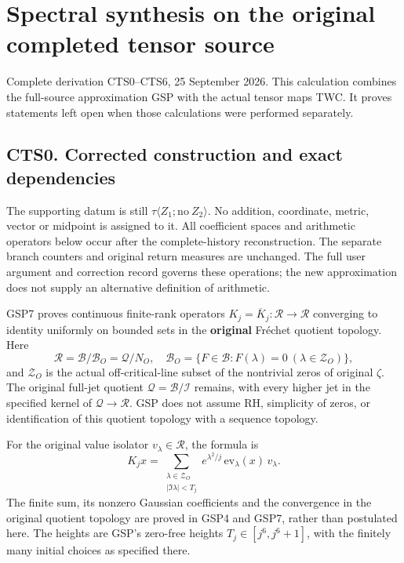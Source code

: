 \section{Spectral synthesis on the original completed tensor
source}\label{spectral-synthesis-on-the-original-completed-tensor-source}

Complete derivation CTS0--CTS6, 25 September 2026. This calculation
combines the full-source approximation GSP with the actual tensor maps
TWC. It proves statements left open when those calculations were
performed separately.

\subsection{CTS0. Corrected construction and exact
dependencies}\label{cts0.-corrected-construction-and-exact-dependencies}

The supporting datum is still
\(\tau\langle Z_1;\mathrm{no}\ Z_2\rangle\). No addition, coordinate,
metric, vector or midpoint is assigned to it. All coefficient spaces and
arithmetic operators below occur after the complete-history
reconstruction. The separate branch counters and original return
measures are unchanged. The full user argument and correction record
governs these operations; the new approximation does not supply an
alternative definition of arithmetic.

GSP7 proves continuous finite-rank operators
\(K_j=\overline K_j:\mathcal R\to\mathcal R\) converging to identity
uniformly on bounded sets in the \textbf{original} Fréchet quotient
topology. Here \[
\mathcal R=\mathcal B/\mathcal B_O=\mathcal Q/N_O,
\quad \mathcal B_O=\{F\in\mathcal B:F(\lambda)=0\ (\lambda\in\mathscr Z_O)\},
\tag{CTS0.1}
\] and \(\mathscr Z_O\) is the actual off-critical-line subset of the
nontrivial zeros of original \(\zeta\). The original full-jet quotient
\(\mathcal Q=\mathcal B/\mathcal I\) remains, with every higher jet in
the specified kernel of \(\mathcal Q\to\mathcal R\). GSP does not assume
RH, simplicity of zeros, or identification of this quotient topology
with a sequence topology.

For the original value isolator \(v_\lambda\in\mathcal R\), the formula
is \[
K_jx=\sum_{\substack{\lambda\in\mathscr Z_O\\|\Im\lambda|<T_j}}
e^{\lambda^2/j}\,\mathrm{ev}_\lambda(x)\,v_\lambda.
\tag{CTS0.2}
\] The finite sum, its nonzero Gaussian coefficients and the convergence
in the original quotient topology are proved in GSP4 and GSP7, rather
than postulated here. The heights are GSP's zero-free heights
\(T_j\in[j^6,j^6+1]\), with the finitely many initial choices as
specified there.

